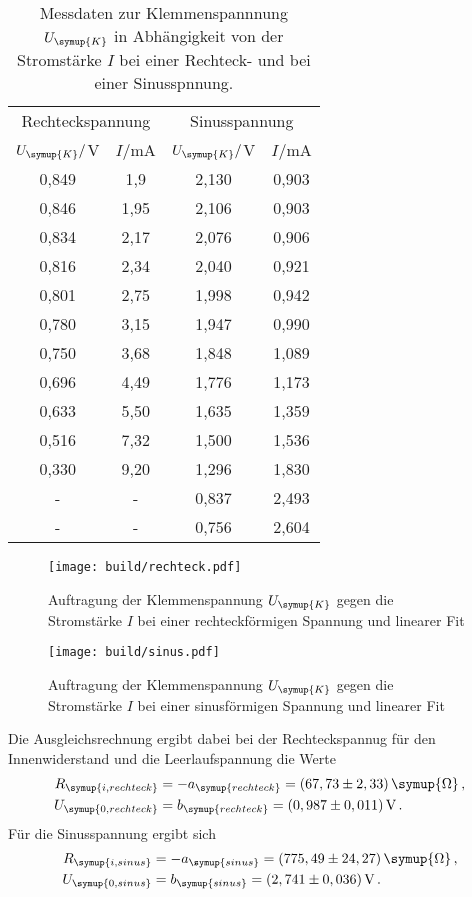 \begin{table}
  \centering
  \caption{Messdaten zur Klemmenspannnung $U_{\symup{K}}$ in Abhängigkeit von der
  Stromstärke $I$ bei einer Rechteck- und bei einer Sinusspnnung.}
  \label{tab:re_sin}
  \begin{tabular}{c c c c}
    \hline
    \multicolumn{2}{c}{Rechteckspannung} & \multicolumn{2}{c}{Sinusspannung} \\
    \cmidrule(lr){1-2}
    \cmidrule(lr){3-4}
    $U_{\symup{K}}/$V & $I/$mA & $U_{\symup{K}}/$V & $I/$mA \\
    \midrule
    0,849 &	1,9   & 2,130 	& 0,903 \\
    0,846	& 1,95  & 2,106	  & 0,903 \\
    0,834	& 2,17  & 2,076 	& 0,906 \\
    0,816	& 2,34  & 2,040 	& 0,921 \\
    0,801	& 2,75  & 1,998	  & 0,942 \\
    0,780	& 3,15  & 1,947	  & 0,990 \\
    0,750	& 3,68  & 1,848	  & 1,089 \\
    0,696	& 4,49  & 1,776	  & 1,173 \\
    0,633	& 5,50  & 1,635	  & 1,359 \\
    0,516	& 7,32  & 1,500	  & 1,536 \\
    0,330	& 9,20  & 1,296	  & 1,830 \\
    -     & -     & 0,837	  & 2,493 \\
    -     & -     & 0,756	  & 2,604 \\
    \bottomrule
  \end{tabular}
\end{table}

\begin{figure}
  \centering
  \texttt{[image: build/rechteck.pdf]}
  \caption{Auftragung der Klemmenspannung $U_{\symup{K}}$ gegen die Stromstärke $I$
  bei einer rechteckförmigen Spannung und linearer Fit}
  \label{fig:rechteck}
\end{figure}

\begin{figure}
  \centering
  \texttt{[image: build/sinus.pdf]}
  \caption{Auftragung der Klemmenspannung $U_{\symup{K}}$ gegen die Stromstärke $I$
  bei einer sinusförmigen Spannung und linearer Fit}
  \label{fig:sinus}
\end{figure}

Die Ausgleichsrechnung ergibt dabei bei der Rechteckspannug für den Innenwiderstand
und die Leerlaufspannung die Werte
\begin{align}
  R_{\symup{i,rechteck}}&=-a_{\symup{rechteck}}=(67,73\pm2,33)\,\symup{\Omega} \,, \\
  U_{\symup{0,rechteck}}&=b_{\symup{rechteck}}=(0,987\pm0,011)\,\text{V}\,.
\end{align}
Für die Sinusspannung ergibt sich
\begin{align}
  R_{\symup{i,sinus}}&=-a_{\symup{sinus}}=(775,49\pm24,27)\,\symup{\Omega} \,, \\
  U_{\symup{0,sinus}}&=b_{\symup{sinus}}=(2,741\pm0,036)\,\text{V}\,.
\end{align}



